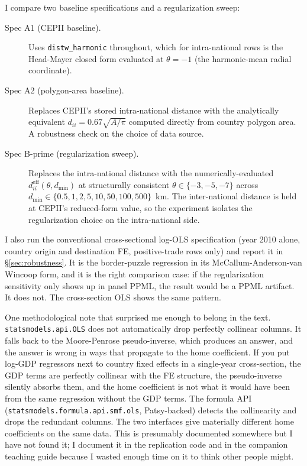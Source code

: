 \documentclass[11pt, letterpaper]{article}
\theoremstyle{definition}
\newcommand{\eff}{\mathrm{eff}}
\newcommand{\dii}{d_{ii}}
\begin{document}
I compare two baseline specifications and a regularization sweep:
\begin{description}
\item[Spec A1 (CEPII baseline).] Uses \texttt{distw\_harmonic}
  throughout, which for intra-national rows is the Head-Mayer closed
  form evaluated at $\theta = -1$ (the harmonic-mean radial coordinate).
\item[Spec A2 (polygon-area baseline).] Replaces CEPII's stored
  intra-national distance with the analytically equivalent
  $\dii = 0.67\sqrt{A/\pi}$ computed directly from country polygon
  area. A robustness check on the choice of data source.
\item[Spec B-prime (regularization sweep).] Replaces the intra-national
  distance with the numerically-evaluated $\dii^{\eff}(\theta, d_{\min})$
  at structurally consistent $\theta \in \{-3, -5, -7\}$ across
  $d_{\min} \in \{0.5, 1, 2, 5, 10, 50, 100, 500\}$~km. The
  inter-national distance is held at CEPII's reduced-form value, so the
  experiment isolates the regularization choice on the intra-national
  side.
\end{description}

I also run the conventional cross-sectional log-OLS specification
(year 2010 alone, country origin and destination FE, positive-trade
rows only) and report it in §\ref{sec:robustness}. It is the
border-puzzle regression in its McCallum-Anderson-van Wincoop form,
and it is the right comparison case: if the regularization
sensitivity only shows up in panel PPML, the result would be a PPML
artifact. It does not. The cross-section OLS shows the same pattern.

One methodological note that surprised me enough to belong in the
text. \texttt{statsmodels.api.OLS} does not automatically drop
perfectly collinear columns. It falls back to the Moore-Penrose
pseudo-inverse, which produces an answer, and the answer is wrong in
ways that propagate to the home coefficient. If you put log-GDP
regressors next to country fixed effects in a single-year cross-section,
the GDP terms are perfectly collinear with the FE structure, the
pseudo-inverse silently absorbs them, and the home coefficient is
not what it would have been from the same regression without the
GDP terms. The formula API
(\texttt{statsmodels.formula.api.smf.ols}, Patsy-backed) detects the
collinearity and drops the redundant columns. The two interfaces
give materially different home coefficients on the same data. This
is presumably documented somewhere but I have not found it; I
document it in the replication code and in the companion teaching
guide because I wasted enough time on it to think other people might.
\end{document}
